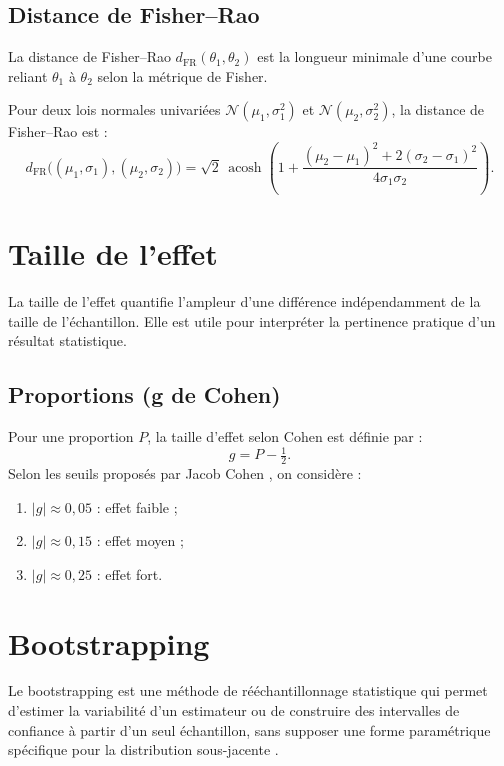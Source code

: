 \subsection{Distance de Fisher–Rao}
La distance de Fisher–Rao $d_{\mathrm{FR}}(\theta_1,\theta_2)$ est la longueur minimale d’une courbe reliant $\theta_1$ à $\theta_2$ selon la métrique de Fisher.

Pour deux lois normales univariées $\mathcal{N}(\mu_1, \sigma_1^2)$ et $\mathcal{N}(\mu_2, \sigma_2^2)$, la distance de Fisher–Rao est \citep{nielsen2023simple} :
\begin{equation}
	d_{\mathrm{FR}}\big((\mu_1,\sigma_1),(\mu_2,\sigma_2)\big)
	= \sqrt{2}\,\operatorname{acosh}\!\left(1 + \frac{(\mu_2 - \mu_1)^2 + 2(\sigma_2 - \sigma_1)^2}{4\sigma_1\sigma_2}\right).
	\label{eq:fr_normal}
\end{equation}

\section{Taille de l'effet}
La taille de l'effet quantifie l'ampleur d'une différence indépendamment de la taille de l’échantillon. Elle est utile pour interpréter la pertinence pratique d’un résultat statistique.

\subsection{Proportions (g de Cohen)}
Pour une proportion $P$, la taille d’effet selon Cohen est définie par :
\begin{equation}
	g = P - \tfrac{1}{2}.
\end{equation}
Selon les seuils proposés par Jacob Cohen \citep{cohen1992power}, on considère :
\begin{enumerate}
	\item $|g| \approx 0{,}05$ : effet faible ;
	\item $|g| \approx 0{,}15$ : effet moyen ;
	\item $|g| \approx 0{,}25$ : effet fort.
\end{enumerate}

\section{Bootstrapping}
Le bootstrapping est une méthode de rééchantillonnage statistique qui permet d'estimer la variabilité d'un estimateur ou de construire des intervalles de confiance à partir d'un seul échantillon, sans supposer une forme paramétrique spécifique pour la distribution sous-jacente \citep{tibshirani1993introduction}.

